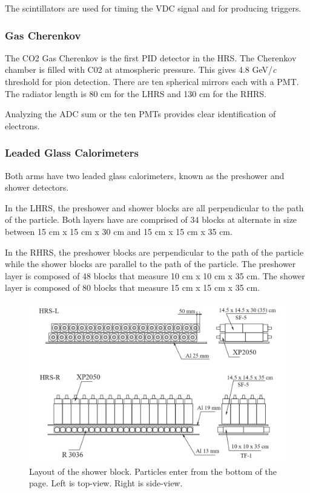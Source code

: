 The scintillators are used for timing the VDC signal and for producing triggers.

\subsubsection{Gas Cherenkov}

The CO2 Gas Cherenkov is the first PID detector in the HRS. The Cherenkov chamber is filled with C02 at atmospheric pressure. This gives 4.8 GeV/\textit{c} threshold for pion detection. There are ten spherical mirrors each with a PMT. The radiator length is 80 cm for the LHRS and 130 cm for the RHRS.

Analyzing the ADC sum or the ten PMTs provides clear identification of electrons.

\subsubsection{Leaded Glass Calorimeters}

Both arms have two leaded glass calorimeters, known as the preshower and shower detectors.

In the LHRS, the preshower and shower blocks are all perpendicular to the path of the particle. Both layers have are comprised of 34 blocks at alternate in size between 15 cm x 15 cm x 30 cm and 15 cm x 15 cm x 35 cm.

In the RHRS, the preshower blocks are perpendicular to the path of the particle while the shower blocks are parallel to the path of the particle. The preshower layer is composed of 48 blocks that measure 10 cm x 10 cm x 35 cm. The shower layer is composed of 80 blocks that measure 15 cm x 15 cm x 35 cm.

\begin{figure}
	\includegraphics[width=\linewidth]{./chap2-exp/fig/shower_layout.png}
	\caption{Layout of the shower block. Particles enter from the bottom of the page. Left is top-view. Right is side-view. \cite{HANIM}}
	\label{shower_layout}
\end{figure}